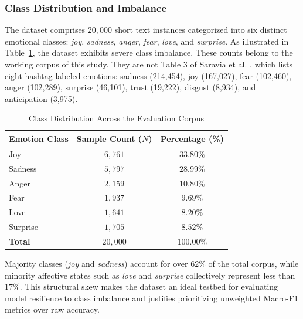 \documentclass[conference]{IEEEtran}
\begin{document}
\subsubsection{Class Distribution and Imbalance}
The dataset comprises $20,000$ short text instances categorized into six distinct emotional classes: \textit{joy}, \textit{sadness}, \textit{anger}, \textit{fear}, \textit{love}, and \textit{surprise}. As illustrated in Table~\ref{tab:carer_distribution}, the dataset exhibits severe class imbalance. These counts belong to the working corpus of this study. They are not Table 3 of Saravia et al. \cite{saravia2018carer}, which lists eight hashtag-labeled emotions: sadness (214,454), joy (167,027), fear (102,460), anger (102,289), surprise (46,101), trust (19,222), disgust (8,934), and anticipation (3,975).

\begin{table}[htbp]
\centering
\caption{Class Distribution Across the Evaluation Corpus}
\label{tab:carer_distribution}
\small
\begin{tabular}{l c c}
\toprule
\textbf{Emotion Class} & \textbf{Sample Count ($N$)} & \textbf{Percentage (\%)} \\
\midrule
Joy & $6,761$ & $33.80\%$ \\
Sadness & $5,797$ & $28.99\%$ \\
Anger & $2,159$ & $10.80\%$ \\
Fear & $1,937$ & $9.69\%$ \\
Love & $1,641$ & $8.20\%$ \\
Surprise & $1,705$ & $8.52\%$ \\
\midrule
\textbf{Total} & $20,000$ & $100.00\%$ \\
\bottomrule
\end{tabular}
\end{table}

Majority classes (\textit{joy} and \textit{sadness}) account for over $62\%$ of the total corpus, while minority affective states 
such as \textit{love} and \textit{surprise} collectively represent less than $17\%$. This structural skew makes the dataset an ideal 
testbed for evaluating model resilience to class imbalance and justifies prioritizing unweighted Macro-F1 metrics over raw accuracy.
\end{document}
